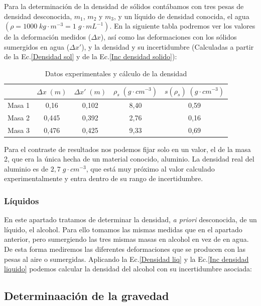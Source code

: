 \documentclass[a4paper,12pt,titlepage]{article}
\begin{document}
Para la determinación de la densidad de sólidos contábamos con tres pesas de densidad desconocida, $m_1$, $m_2$ y $m_3$, y un líquido de densidad conocida, el agua $(\rho = 1000 \; kg\cdot m^{-3}=1 \; g\cdot mL^{-1})$. En la siguiente tabla podremos ver los valores de la deformación medidos ($\Delta x$), así como las deformaciones con los sólidos sumergidos en agua ($\Delta x'$), y la densidad y su incertidumbre (Calculadas a partir de la Ec.\ref{Densidad sol} y de la Ec.\ref{Inc densidad solido}):

\begin{table}[h!]
    \centering
    \begin{tabular}{c|c|c|c|c|}
    \cline{2-5}
    \multicolumn{1}{l|}{}        & $\Delta x \; (m)$ & $\Delta x' \; (m)$ & $\rho_s \; (g\cdot cm^{-3})$ & $s(\rho_s) \; (g\cdot cm^{-3})$ \\ \hline
    \multicolumn{1}{|c|}{Masa 1} & 0,16  & 0,102 & 8,40 & 0,59 \\ \hline
    \multicolumn{1}{|c|}{Masa 2} & 0,445 & 0,392 & 2,76 & 0,16 \\ \hline
    \multicolumn{1}{|c|}{Masa 3} & 0,476 & 0,425 & 9,33 & 0,69 \\ \hline
    \end{tabular}
    \caption{Datos experimentales y cálculo de la densidad}
    \label{Datos dens sol}
\end{table}

Para el contraste de resultados nos podemos fijar solo en un valor, el de la masa 2, que era la única hecha de un material conocido, aluminio. La densidad real del aluminio es de $2,7 \; g\cdot cm^{-3}$, que está muy próximo al valor calculado experimentalmente y entra dentro de su rango de incertidumbre.

\subsubsection{Líquidos}

En este apartado tratamos de determinar la densidad, \textit{a priori} desconocida, de un líquido, el alcohol. Para ello tomamos las mismas medidas que en el apartado anterior, pero sumergiendo las tres mismas masas en alcohol en vez de en agua. De esta forma mediremos las diferentes deformaciones que se producen con las pesas al aire o sumergidas. Aplicando la Ec.\ref{Densidad liq} y la Ec.\ref{Inc densidad liquido} podemos calcular la densidad del alcohol con su incertidumbre asociada:

\subsection{Determinaación de la gravedad}
\end{document}
